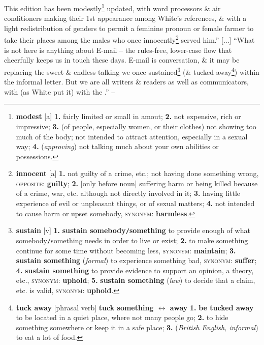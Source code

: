 \documentclass[oneside]{book}
\numberwithin{equation}{section}
\begin{document}
This edition has been modestly\footnote{\textbf{modest} [a] \textbf{1.} fairly limited or small in amout; \textbf{2.} not expensive, rich or impressive; \textbf{3.} (of people, especially women, or their clothes) not showing too much of the body; not intended to attract attention, especially in a sexual way; \textbf{4.} (\textit{approving}) not talking much about your own abilities or possessions.} updated, with word processors \& air conditioners making their 1st appearance among White's references, \& with a light redistribution of genders to permit a feminine pronoun or female farmer to take their places among the males who once innocently\footnote{\textbf{innocent} [a] \textbf{1.} not guilty of a crime, etc.; not having done something wrong, \textsc{opposite}: \textbf{guilty}; \textbf{2.} [only before noun] suffering harm or being killed because of a crime, war, etc. although not directly involved in it; \textbf{3.} having little experience of evil or unpleasant things, or of sexual matters; \textbf{4.} not intended to cause harm or upset somebody, \textsc{synonym}: \textbf{harmless}.} served him.'' [$\ldots$] ``What is not here is anything about E-mail -- the rules-free, lower-case flow that cheerfully keeps us in touch these days. E-mail is conversation, \& it may be replacing the sweet \& endless talking we once sustained\footnote{\textbf{sustain} [v] \textbf{1.} \textbf{sustain somebody\texttt{/}something} to provide enough of what somebody\texttt{/}something needs in order to live or exist; \textbf{2.} to make something continue for some time without becoming less, \textsc{synonym}: \textbf{maintain}; \textbf{3.} \textbf{sustain something} (\textit{formal}) to experience something bad, \textsc{synonym}: \textbf{suffer}; \textbf{4.} \textbf{sustain something} to provide evidence to support an opinion, a theory, etc., \textsc{synonym}: \textbf{uphold}; \textbf{5.} \textbf{sustain something} (\textit{law}) to decide that a claim, etc. is valid, \textsc{synonym}: \textbf{uphold}.} (\& tucked away\footnote{\textbf{tuck away} [phrasal verb] \textbf{tuck something $\leftrightarrow$ away} \textbf{1.} \textbf{be tucked away} to be located in a quiet place, where not many people go; \textbf{2.} to hide something somewhere or keep it in a safe place; \textbf{3.} (\textit{British English, informal}) to eat a lot of food.}) within the informal letter. But we are all writers \& readers as well as communicators, with  (as White put it) with the .'' -- \cite[\textit{Foreword} by Roger Angell]{Strunk_White2019}
\end{document}
